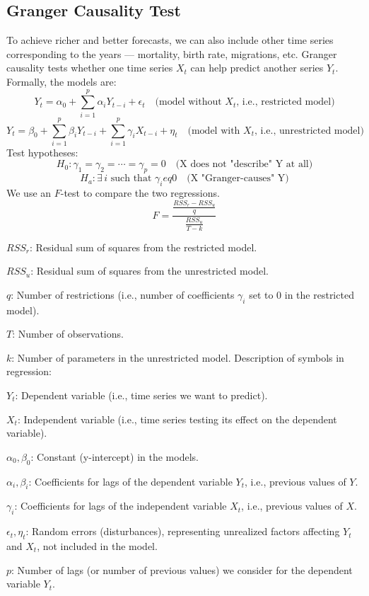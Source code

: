 \documentclass[a4paper,11pt]{article}
\begin{document}
\subsection{Granger Causality Test}
To achieve richer and better forecasts, we can also include other time series corresponding to the years — mortality, birth rate, migrations, etc. Granger causality tests whether one time series $X_t$ can help predict another series $Y_t$. Formally, the models are:
$$
Y_t = \alpha_0 + \sum_{i=1}^p \alpha_i Y_{t-i} + \epsilon_t \quad \text{(model without } X_t\text{, i.e., restricted model)}
$$
$$
Y_t = \beta_0 + \sum_{i=1}^p \beta_i Y_{t-i} + \sum_{i=1}^p \gamma_i X_{t-i} + \eta_t \quad \text{(model with } X_t\text{, i.e., unrestricted model)}
$$
Test hypotheses:
$$
H_0: \gamma_1 = \gamma_2 = \cdots = \gamma_p = 0 \quad \text{(X does not "describe" Y at all)}
$$
$$
H_a: \exists \, i \text{ such that } \gamma_i 
eq 0 \quad \text{(X "Granger-causes" Y)}
$$
We use an $F$-test to compare the two regressions.
$$
F = \frac{\frac{RSS_r - RSS_u}{q}}{\frac{RSS_u}{T - k}}
$$
\item \( RSS_r \): Residual sum of squares from the restricted model.
    \item \( RSS_u \): Residual sum of squares from the unrestricted model.
    \item \( q \): Number of restrictions (i.e., number of coefficients \( \gamma_i \) set to 0 in the restricted model).
    \item \( T \): Number of observations.
    \item \( k \): Number of parameters in the unrestricted model.
Description of symbols in regression:
\item \( Y_t \): Dependent variable (i.e., time series we want to predict).
    \item \( X_t \): Independent variable (i.e., time series testing its effect on the dependent variable).
    \item \( \alpha_0, \beta_0 \): Constant (y-intercept) in the models.
    \item \( \alpha_i, \beta_i \): Coefficients for lags of the dependent variable \( Y_t \), i.e., previous values of \( Y \).
    \item \( \gamma_i \): Coefficients for lags of the independent variable \( X_t \), i.e., previous values of \( X \).
    \item \( \epsilon_t, \eta_t \): Random errors (disturbances), representing unrealized factors affecting \( Y_t \) and \( X_t \), not included in the model.
    \item \( p \): Number of lags (or number of previous values) we consider for the dependent variable \( Y_t \).
\end{document}
